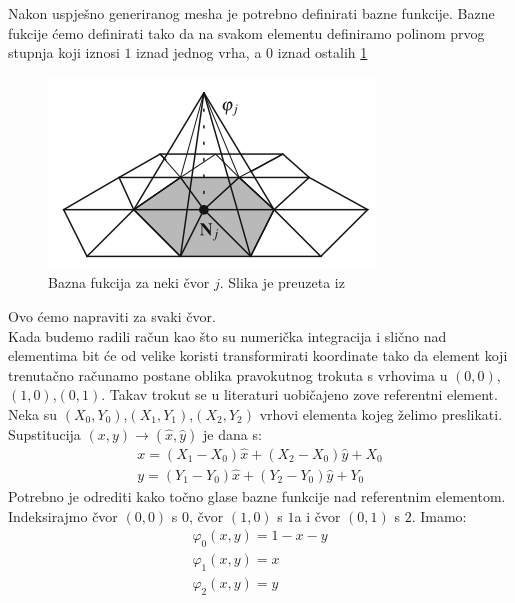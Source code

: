 \documentclass[zavrsnirad]{../fer}
\begin{document}
Nakon uspješno generiranog mesha je potrebno definirati
bazne funkcije. Bazne fukcije ćemo definirati tako da
na svakom elementu definiramo polinom prvog stupnja koji
iznosi $1$ iznad jednog vrha, a $0$ iznad ostalih \ref{baznaFja}
\begin{figure}[htb]
	\centering
	\includegraphics[width=0.5\linewidth]{Figures/baznaFja.png}
  \caption{Bazna fukcija za neki čvor $j$. Slika je preuzeta iz \cite{Quarteroni}}
	\label{baznaFja}
\end{figure}
Ovo ćemo napraviti za svaki čvor. 
\bigskip
\\ 
Kada budemo radili račun kao što su numerička integracija i 
slično nad elementima bit će od velike koristi transformirati
koordinate tako da element koji trenutačno računamo postane 
oblika pravokutnog trokuta s vrhovima u $(0,0)$,$(1,0)$,$(0,1)$. 
Takav trokut se u literaturi uobičajeno zove referentni element.
Neka su $(X_0, Y_0)$,$(X_1, Y_1)$,$(X_2, Y_2)$ vrhovi elementa
kojeg želimo preslikati. Supstitucija $(x, y) \rightarrow (\hat x, \hat y)$
je dana s:
\begin{align}
  x = (X_1 - X_0)\hat x + (X_2 - X_0)\hat y + X_0 \\ 
  y = (Y_1 - Y_0)\hat x +(Y_2 - Y_0) \hat y + Y_0
\end{align}
Potrebno je odrediti kako točno glase bazne funkcije nad 
referentnim elementom.
Indeksirajmo čvor $(0,0)$ s $0$, čvor $(1,0)$ s $1$a i 
čvor $(0, 1)$ s $2$.
Imamo:
\begin{align}
\varphi_0(x,y) = 1 - x - y\\
\varphi_1(x,y) = x\\
\varphi_2(x,y) = y
\end{align}
\newpage
\end{document}
